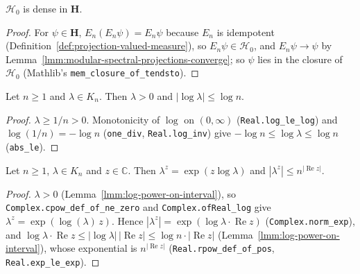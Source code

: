 \begin{lemma}
    \label{lmm:modular-H0-dense}
    \leanok
    $\mathcal{H}_0$ is dense in $\mathbf{H}$.
\end{lemma}
\begin{proof}
    \leanok
    For $\psi \in \mathbf{H}$, $E_n(E_n\psi) = E_n\psi$ because $E_n$ is idempotent (Definition~\ref{def:projection-valued-measure}), so $E_n\psi \in \mathcal{H}_0$, and $E_n\psi \to \psi$ by Lemma~\ref{lmm:modular-spectral-projections-converge}; so $\psi$ lies in the closure of $\mathcal{H}_0$ (Mathlib's \texttt{mem\_closure\_of\_tendsto}).
\end{proof}

\begin{lemma}[Logarithms on $K_n$]
    \label{lmm:log-power-on-interval}
    \leanok
    Let $n \ge 1$ and $\lambda \in K_n$. Then $\lambda > 0$ and $|\log\lambda| \le \log n$.
\end{lemma}
\begin{proof}
    \leanok
    $\lambda \ge 1/n > 0$. Monotonicity of $\log$ on $(0, \infty)$ (\texttt{Real.log\_le\_log}) and $\log(1/n) = -\log n$ (\texttt{one\_div}, \texttt{Real.log\_inv}) give $-\log n \le \log\lambda \le \log n$ (\texttt{abs\_le}).
\end{proof}

\begin{lemma}[Powers on $K_n$]
    \label{lmm:cpow-on-interval}
    \leanok
    Let $n \ge 1$, $\lambda \in K_n$ and $z \in \mathbb{C}$. Then $\lambda^z = \exp(z\log\lambda)$ and $|\lambda^z| \le n^{|\operatorname{Re} z|}$.
\end{lemma}
\begin{proof}
    \leanok
    $\lambda > 0$ (Lemma~\ref{lmm:log-power-on-interval}), so \texttt{Complex.cpow\_def\_of\_ne\_zero} and \texttt{Complex.ofReal\_log} give $\lambda^z = \exp(\log(\lambda)\, z)$. Hence $|\lambda^z| = \exp(\log\lambda \cdot \operatorname{Re} z)$ (\texttt{Complex.norm\_exp}), and $\log\lambda \cdot \operatorname{Re} z \le |\log\lambda|\,|\operatorname{Re} z| \le \log n \cdot |\operatorname{Re} z|$ (Lemma~\ref{lmm:log-power-on-interval}), whose exponential is $n^{|\operatorname{Re} z|}$ (\texttt{Real.rpow\_def\_of\_pos}, \texttt{Real.exp\_le\_exp}).
\end{proof}

